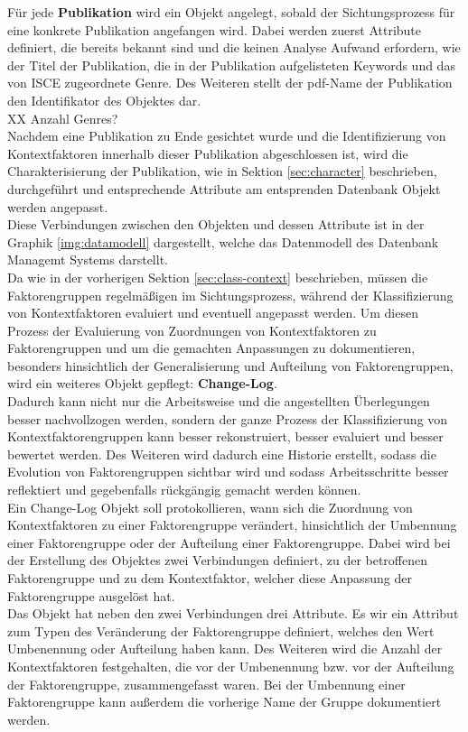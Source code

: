 Für jede \textbf{Publikation} wird ein Objekt angelegt, sobald der Sichtungsprozess für eine konkrete Publikation angefangen wird. Dabei werden zuerst Attribute definiert, die bereits bekannt sind und die keinen Analyse Aufwand erfordern, wie der Titel der Publikation, die in der Publikation aufgelisteten Keywords und das von ISCE zugeordnete Genre. Des Weiteren stellt der pdf-Name der Publikation den Identifikator des Objektes dar. \\ XX Anzahl Genres? \\
Nachdem eine Publikation zu Ende gesichtet wurde und die Identifizierung von Kontextfaktoren innerhalb dieser Publikation abgeschlossen ist, wird die Charakterisierung der Publikation, wie in Sektion \ref{sec:character} beschrieben, durchgeführt und entsprechende Attribute am entsprenden Datenbank Objekt werden angepasst. \\

Diese Verbindungen zwischen den Objekten und dessen Attribute ist in der Graphik \ref{img:datamodell} dargestellt, welche das Datenmodell des Datenbank Managemt Systems darstellt. \\

Da wie in der vorherigen Sektion \ref{sec:class-context} beschrieben, müssen die Faktorengruppen regelmäßigen im Sichtungsprozess, während der Klassifizierung von Kontextfaktoren evaluiert und eventuell angepasst werden. Um diesen Prozess der Evaluierung von Zuordnungen von Kontextfaktoren zu Faktorengruppen und um die gemachten Anpassungen zu dokumentieren, besonders hinsichtlich der Generalisierung und Aufteilung von Faktorengruppen, wird ein weiteres Objekt gepflegt: \textbf{Change-Log}. \\
Dadurch kann nicht nur die Arbeitsweise und die angestellten Überlegungen besser nachvollzogen werden, sondern der ganze Prozess der Klassifizierung von Kontextfaktorengruppen kann besser rekonstruiert, besser evaluiert und besser bewertet werden. Des Weiteren wird dadurch eine Historie erstellt, sodass die Evolution von Faktorengruppen sichtbar wird und sodass Arbeitsschritte besser reflektiert und gegebenfalls rückgängig gemacht werden können. \\

Ein Change-Log Objekt soll protokollieren, wann sich die Zuordnung von Kontextfaktoren zu einer Faktorengruppe verändert, hinsichtlich der Umbennung einer Faktorengruppe oder der Aufteilung einer Faktorengruppe. Dabei wird bei der Erstellung des Objektes zwei Verbindungen definiert, zu der betroffenen Faktorengruppe und zu dem Kontextfaktor, welcher diese Anpassung der Faktorengruppe ausgelöst hat. \\
Das Objekt hat neben den zwei Verbindungen drei Attribute. Es wir ein Attribut zum Typen des Veränderung der Faktorengruppe definiert, welches den Wert Umbenennung oder Aufteilung haben kann. Des Weiteren wird die Anzahl der Kontextfaktoren festgehalten, die vor der Umbenennung bzw. vor der Aufteilung der Faktorengruppe, zusammengefasst waren. Bei der Umbennung einer Faktorengruppe kann außerdem die vorherige Name der Gruppe dokumentiert werden. \\
 
